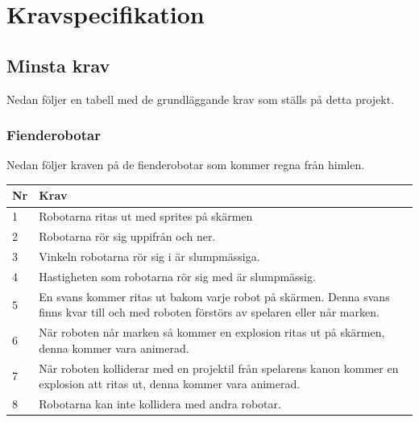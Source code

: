 \documentclass{TDP003mall}
\begin{document}
\section{Kravspecifikation}
\subsection{Minsta krav}
Nedan följer en tabell med de grundläggande krav som ställs på detta projekt.
\subsubsection{Fienderobotar}
Nedan följer kraven på de fienderobotar som kommer regna från himlen.
\begin{table}[!h]
\begin{tabularx}{\linewidth}{|l|X|}
\hline
Nr & Krav\\\hline
1 & Robotarna ritas ut med sprites på skärmen \\\hline
2 & Robotarna rör sig uppifrån och ner.\\\hline
3 & Vinkeln robotarna rör sig i är slumpmässiga.\\\hline
4 & Hastigheten som robotarna rör sig med är slumpmässig.\\\hline
5 & En svans kommer ritas ut bakom varje robot på skärmen. Denna svans finns kvar till och med roboten förstörs av spelaren eller når marken.\\\hline
6 & När roboten når marken så kommer en explosion ritas ut på skärmen, denna kommer vara animerad.\\\hline
7 & När roboten kolliderar med en projektil från spelarens kanon kommer en explosion att ritas ut, denna kommer vara animerad.\\\hline
8 & Robotarna kan inte kollidera med andra robotar.\\\hline
\end{tabularx}
\end{table}

\newpage
\end{document}
